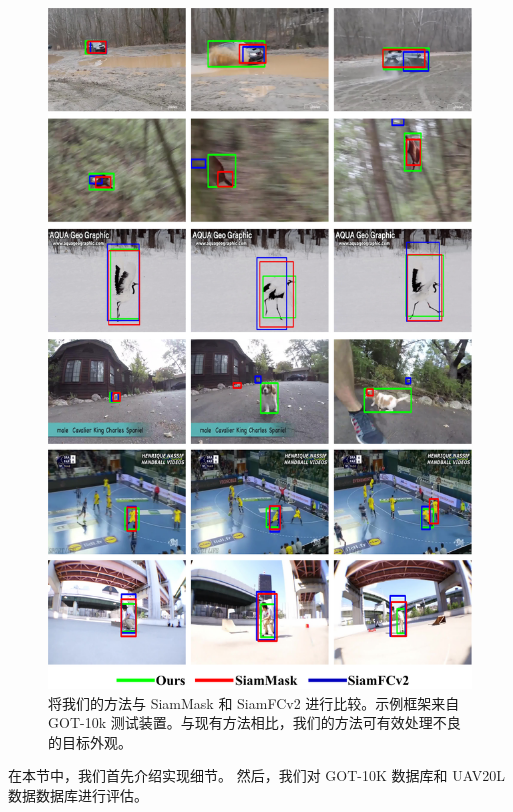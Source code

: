 \begin{figure}[t]
    \centering
    \includegraphics[width=1.0\textwidth]{Img/end/visulization.pdf}
    \caption{将我们的方法与 SiamMask 和 SiamFCv2 进行比较。示例框架来自 GOT-10k 测试装置。与现有方法相比，我们的方法可有效处理不良的目标外观。}
    \label{fig:visulization}
\end{figure}

在本节中，我们首先介绍实现细节。
然后，我们对 GOT-10K \cite{GOT-10k} 数据库和 UAV20L \cite{mueller2016benchmark} 数据数据库进行评估。
